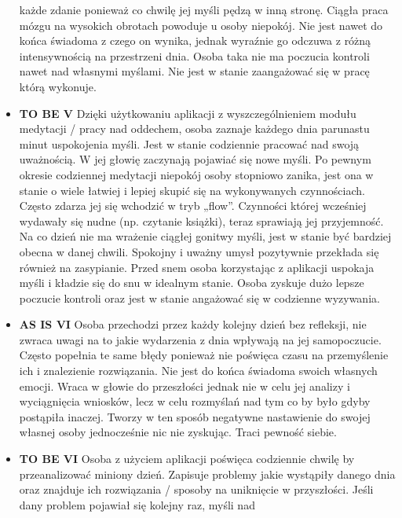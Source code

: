 \begin{itemize}
          każde zdanie ponieważ co chwilę jej myśli pędzą w inną stronę. Ciągła
          praca mózgu na wysokich obrotach powoduje u osoby niepokój. Nie jest
          nawet do końca świadoma z czego on wynika, jednak wyraźnie go odczuwa
          z różną intensywnością na przestrzeni dnia. Osoba taka nie ma poczucia
          kontroli nawet nad własnymi myślami. Nie jest w stanie zaangażować się
          w pracę którą wykonuje.
    \item \textbf{TO BE V} Dzięki użytkowaniu aplikacji z wyszczególnieniem
          modułu medytacji / pracy nad oddechem, osoba zaznaje każdego dnia
          parunastu minut uspokojenia myśli. Jest w stanie codziennie pracować
          nad swoją uważnością. W jej głowię zaczynają pojawiać się nowe myśli.
          Po pewnym okresie codziennej medytacji niepokój osoby stopniowo
          zanika, jest ona w stanie o wiele łatwiej i lepiej skupić się na
          wykonywanych czynnościach. Często zdarza jej się wchodzić w tryb
          „flow”. Czynności której wcześniej wydawały się nudne (np. czytanie
          książki), teraz sprawiają jej przyjemność. Na co dzień nie ma wrażenie
          ciągłej gonitwy myśli, jest w stanie być bardziej obecna w danej
          chwili. Spokojny i uważny umysł pozytywnie przekłada się również na
          zasypianie. Przed snem osoba korzystając z aplikacji uspokaja myśli i
          kładzie się do snu w idealnym stanie. Osoba zyskuje dużo lepsze
          poczucie kontroli oraz jest w stanie angażować się w codzienne
          wyzywania.
    \item \textbf{AS IS VI} Osoba przechodzi przez każdy kolejny dzień bez
          refleksji, nie zwraca uwagi na to jakie wydarzenia z dnia wpływają na
          jej samopoczucie. Często popełnia te same błędy ponieważ nie poświęca
          czasu na przemyślenie ich i znalezienie rozwiązania. Nie jest do końca
          świadoma swoich własnych emocji. Wraca w głowie do przeszłości jednak
          nie w celu jej analizy i wyciągnięcia wniosków, lecz w celu rozmyślań
          nad tym co by było gdyby postąpiła inaczej. Tworzy w ten sposób
          negatywne nastawienie do swojej własnej osoby jednocześnie nic nie
          zyskując. Traci pewność siebie.
    \item \textbf{TO BE VI} Osoba z użyciem aplikacji poświęca codziennie chwilę
          by przeanalizować miniony dzień. Zapisuje problemy jakie wystąpiły
          danego dnia oraz znajduje ich rozwiązania / sposoby na uniknięcie w
          przyszłości. Jeśli dany problem pojawiał się kolejny raz, myśli nad

\end{itemize}
